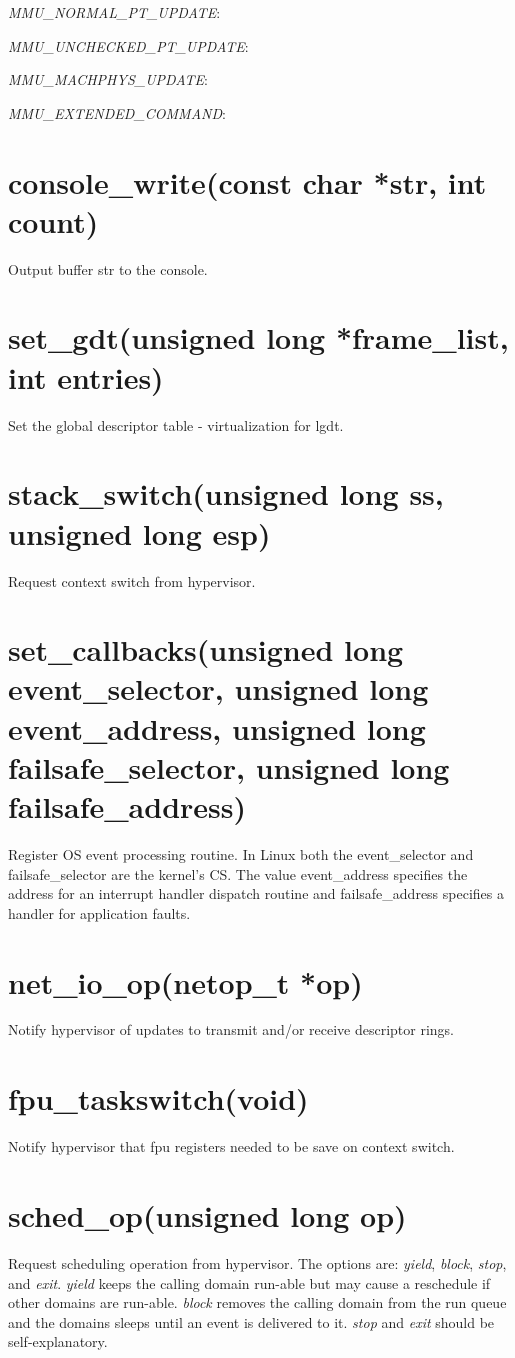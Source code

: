 \documentclass[11pt,twoside,final,openright]{xenstyle}
\begin{document}
{\it MMU\_NORMAL\_PT\_UPDATE}:

{\it MMU\_UNCHECKED\_PT\_UPDATE}:

{\it MMU\_MACHPHYS\_UPDATE}:

{\it MMU\_EXTENDED\_COMMAND}:

\section{ console\_write(const char *str, int count)}
Output buffer str to the console.

\section{ set\_gdt(unsigned long *frame\_list, int entries)} 
Set the global descriptor table - virtualization for lgdt.

\section{ stack\_switch(unsigned long ss, unsigned long esp)} 
Request context switch from hypervisor.

\section{ set\_callbacks(unsigned long event\_selector, unsigned long event\_address,
                        unsigned long failsafe\_selector, unsigned long failsafe\_address) } 
 Register OS event processing routine. In Linux both the event\_selector and 
failsafe\_selector are the kernel's CS. The value event\_address specifies the address for
an interrupt handler dispatch routine and failsafe\_address specifies a handler for 
application faults.

\section{ net\_io\_op(netop\_t *op)}  
Notify hypervisor of updates to transmit and/or receive descriptor rings.

\section{ fpu\_taskswitch(void)} 
Notify hypervisor that fpu registers needed to be save on context switch.

\section{ sched\_op(unsigned long op)} 
Request scheduling operation from hypervisor. The options are: {\it yield},
{\it block}, {\it stop}, and {\it exit}. {\it yield} keeps the calling
domain run-able but may cause a reschedule if other domains are
run-able. {\it block} removes the calling domain from the run queue and the
domains sleeps until an event is delivered to it. {\it stop} and {\it exit}
should be self-explanatory.
\end{document}
